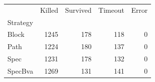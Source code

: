 \begin{tabular}{lrrrr}
\toprule
 & Killed & Survived & Timeout & Error \\
Strategy &  &  &  &  \\
\midrule
Block & 1245 & 178 & 118 & 0 \\
Path & 1224 & 180 & 137 & 0 \\
Spec & 1231 & 178 & 132 & 0 \\
SpecBva & 1269 & 131 & 141 & 0 \\
\bottomrule
\end{tabular}
